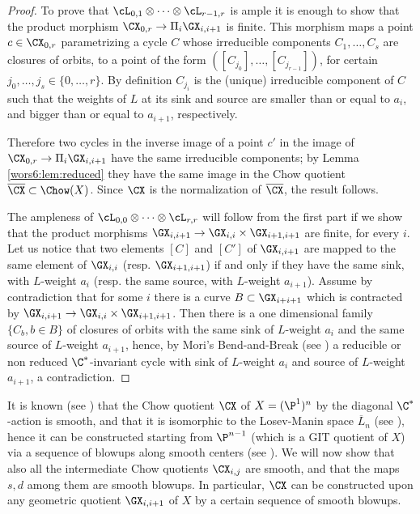\documentclass[reqno]{amsproc}
\theoremstyle{definition}
\begin{document}
\begin{proof} 
To prove that $\cL_{0,1}\otimes\cdots\otimes\cL_{r-1,r}$ is ample
it is enough to show that the product morphism $\CX_{0,r} \to \Pi_i \GX_{i,i+1}$ is finite. This morphism maps a point $c \in \CX_{0,r}$ parametrizing a cycle
$C$ whose irreducible components  $C_1, \dots, C_s$ are closures of orbits, to a point of the form $([C_{j_0}], \dots, [C_{j_{r-1}}])$, for certain $j_0,\dots,j_s\in \{0,\dots,r\}$.
By definition $C_{j_i}$ is the (unique) irreducible component of $C$ such that the weights of $L$ at its sink and source are smaller than or equal to $a_i$, and bigger than or equal to $ a_{i+1}$, respectively. 


Therefore two cycles in the inverse image of a point $c'$ in the image of $\CX_{0,r} \to \Pi_i \GX_{i,i+1}$ have the same irreducible components; by Lemma \ref{wors6:lem:reduced} they have the same image in the Chow quotient $\overline{\CX}\subset\Chow(X)$. Since $\CX$ is the normalization of $\overline{\CX}$,  the result follows.

The ampleness of $ \cL_{0,0}\otimes\cdots\otimes\cL_{r,r}$ will follow from the first part if we show that
 the product morphisms $\GX_{i,i+1}\rightarrow\GX_{i,i}\times\GX_{i+1,i+1}$ are finite, for every $i$. Let us notice that two elements $[C]$ and $[C']$ of $\GX_{i,i+1}$ are mapped to the same element of $\GX_{i,i}$ (resp. $\GX_{i+1,i+1}$) if and only if they have the same sink, with $L$-weight $a_i$ (resp.  the same source, with $L$-weight $a_{i+1}$).
Assume by contradiction that for some $i$ there is a curve $B\subset\GX_{i+i+1}$ which is contracted by $\GX_{i,i+1}\rightarrow\GX_{i,i}\times\GX_{i+1,i+1}$. Then there is a one dimensional family $\{C_b, b \in B\}$ of closures of orbits with the same sink of $L$-weight $a_i$ and the same source of  $L$-weight $a_{i+1}$, hence,  by Mori's Bend-and-Break (see \cite[Proposition 3.2]{wors6-De}) a reducible or non reduced $\C^*$-invariant cycle with sink of $L$-weight $a_i$ and source of  $L$-weight $a_{i+1}$, a contradiction.
\end{proof}

It is known (see \cite[1.1]{wors6-DRS}) that the Chow quotient $\CX$ of $X=(\P^1)^n$ by the diagonal $\C^*$-action is smooth, and that it is isomorphic to the Losev-Manin space $\overline{L}_n$ (see \cite{wors6-LS}), hence it can be constructed starting from $\P^{n-1}$ (which is a GIT quotient of $X$) via a sequence of blowups along smooth centers (see \cite[6.1]{wors6-Hassett}). We will now show that also all the intermediate Chow quotients $\CX_{i,j}$ are smooth, and that the maps $s,d$ among them are smooth blowups. In particular, $\CX$ can be constructed upon any geometric quotient $\GX_{i,i+1}$ of $X$ by a certain sequence of smooth blowups.
\end{document}
